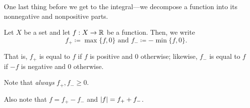 One last thing before we get to the integral---we decompose a function into its nonnegative and nonpositive parts.
\begin{dfn}
Let $X$ be a set and let $f:X\rightarrow \mathbb{R}$ be a function.  Then, we write
\begin{equation}
f_+\coloneqq \max \{ f,0\} \text{ and }f_-\coloneqq -\min \{ f,0\} .
\end{equation}
\begin{rmk}
That is, $f_+$ is equal to $f$ if $f$ is positive and $0$ otherwise; likewise, $f_-$ is equal to $f$ if $-f$ is negative and $0$ otherwise.
\end{rmk}
\begin{rmk}
Note that \emph{always} $f_+,f_-\geq 0$.
\end{rmk}
\begin{rmk}
Also note that $f=f_+-f_-$ and $\lvert f\rvert=f_++f_-$.
\end{rmk}
\end{dfn}
